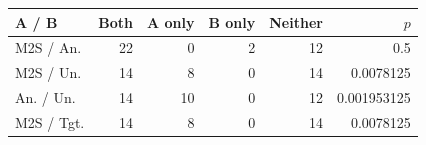 \begin{tabular}{lrrrrr}
\toprule
A / B & Both & A only & B only & Neither & $p$ \\
\midrule
M2S / An. & 22 & 0 & 2 & 12 & 0.5 \\
M2S / Un. & 14 & 8 & 0 & 14 & 0.0078125 \\
An. / Un. & 14 & 10 & 0 & 12 & 0.001953125 \\
M2S / Tgt. & 14 & 8 & 0 & 14 & 0.0078125 \\
\bottomrule
\end{tabular}
